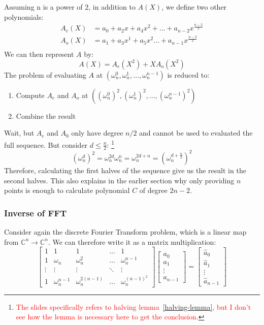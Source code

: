 \documentclass[10pt]{article}
\newcommand{\HL}[1]{\textcolor{red}{#1}}
\begin{document}
Assuming n is a power of $2$, in addition to $A(X)$, we define two other
polynomials:
\[
\begin{aligned}
    A_e(X) &= a_0 + a_2x + a_4x^2 + \ldots + a_{n-2}x^{\frac{n-2}{2}} \\
    A_o(X) &= a_1 + a_3x^1 + a_5x^{2} \ldots + a_{n-1}x^{\frac{n-2}{2}} \\
\end{aligned}
\]
We can then represent $A$ by:
\[
    A(X) = A_e(X^2) + XA_o(X^2)
\]
The problem of evaluating $A$ at $(\omega^0_n, \omega^1_n, \ldots, \omega^{n-1}_n)$
is reduced to:
\begin{enumerate}
    \item Compute $A_e$ and $A_o$ at $((\omega^0_n)^2, (\omega^1_n)^2, \ldots,
        (\omega^{n-1}_n)^2)$
    \item Combine the result
\end{enumerate}
Wait, but $A_e$ and $A_0$ only have degree $n/2$ and cannot be used to
evaluated the full sequence. But consider $d \leq \frac{n}{2}$:
\footnote{\HL{The slides specifically refers to halving
lemma~\ref{halving-lemma}, but I don't see how the lemma is necessary here to
get the conclusion.}}
\[
    (\omega^{d}_n)^2 = \omega^{2d}_{n}\omega^{n}_{n} = \omega^{2d+n}_{n} =
    (\omega^{d + \frac{n}{2}}_n)^2
\]
Therefore, calculating the first halves of the sequence give us the result in the second
halves. This also explains in the earlier section why only providing $n$ points
is enough to calculate polynomial $C$ of degree $2n-2$.

\subsubsection{Inverse of FFT}
Consider again the discrete Fourier Transform problem, which is a linear map from
$\mathbb{C}^n \rightarrow \mathbb{C}^n$. We can therefore write it as a matrix
multiplication:
\[
\begin{bmatrix}
    1      & 1              & 1                 & \ldots & 1\\
    1      & \omega_n       & \omega^2_n        & \ldots & \omega^{n-1}_n \\
    \vdots & \vdots         & \vdots            & \ddots & \vdots \\
    1      & \omega^{n-1}_n & \omega^{2(n-1)}_n & \ldots & \omega^{(n-1)^2}_n
\end{bmatrix}
\begin{bmatrix} a_0\\ a_1\\ \vdots\\ a_{n-1} \end{bmatrix}
=
\begin{bmatrix} \hat{a}_0\\ \hat{a}_1\\ \vdots\\ \hat{a}_{n-1} \end{bmatrix}
\]
\end{document}
